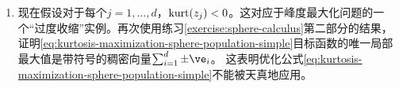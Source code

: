 \documentclass[../../book-main_zh.tex]{subfiles}
\begin{document}
\begin{exercise}
\begin{enumerate}
        \item 现在假设对于每个$j =1, \dots, d$，$\mathop{\mathrm{kurt}}(z_j) < 0$。这对应于峰度最大化问题的一个“过度收缩”实例。再次使用练习\ref{exercise:sphere-calculus}第二部分的结果，证明\eqref{eq:kurtosis-maximization-sphere-population-simple}目标函数的唯一局部最大值是带符号的稠密向量$\sum_{i=1}^d \pm \ve_i$。
        这表明优化公式\eqref{eq:kurtosis-maximization-sphere-population-simple}不能被天真地应用。
    \end{enumerate}
\end{exercise}

\begin{exercise}\label{exercise:fast-ica-convergence}
\end{exercise}

\end{document}
